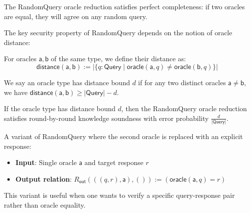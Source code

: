\begin{theorem}
    The RandomQuery oracle reduction satisfies perfect completeness: if two oracles are equal, they will agree on any random query.
\end{theorem}

The key security property of RandomQuery depends on the notion of oracle distance:

\begin{definition}
    \label{def:oracle_distance}
    For oracles $\mathsf{a}, \mathsf{b}$ of the same type, we define their distance as:
    \[ \mathsf{distance}(\mathsf{a}, \mathsf{b}) := |\{q : \mathsf{Query} \mid \mathsf{oracle}(\mathsf{a}, q) \neq \mathsf{oracle}(\mathsf{b}, q)\}| \]

    We say an oracle type has distance bound $d$ if for any two distinct oracles $\mathsf{a} \neq \mathsf{b}$, we have $\mathsf{distance}(\mathsf{a}, \mathsf{b}) \geq |\mathsf{Query}| - d$.
\end{definition}

\begin{theorem}
    If the oracle type has distance bound $d$, then the RandomQuery oracle reduction satisfies round-by-round knowledge soundness with error probability $\frac{d}{|\mathsf{Query}|}$.
\end{theorem}

\begin{definition}
    \label{def:randomquery_with_response}
    A variant of RandomQuery where the second oracle is replaced with an explicit response:
    \begin{itemize}
        \item \textbf{Input}: Single oracle $\mathsf{a}$ and target response $r$
        \item \textbf{Output relation}: $R_{\mathsf{out}}(((q, r), \mathsf{a}), ()) := (\mathsf{oracle}(\mathsf{a}, q) = r)$
    \end{itemize}
    This variant is useful when one wants to verify a specific query-response pair rather than oracle equality.
\end{definition}

